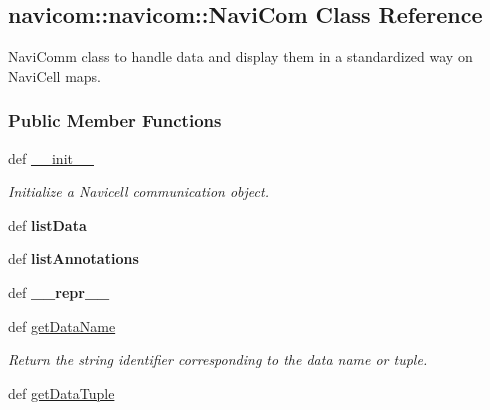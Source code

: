 \hypertarget{classnavicom_1_1navicom_1_1NaviCom}{
\subsection{navicom::navicom::NaviCom Class Reference}
\label{classnavicom_1_1navicom_1_1NaviCom}
}


NaviComm class to handle data and display them in a standardized way on NaviCell maps.  


\subsubsection*{Public Member Functions}
\begin{DoxyCompactItemize}
\item 
def \hyperlink{classnavicom_1_1navicom_1_1NaviCom_ae6133fe7ec63cf5643c1794f4f8e2349}{\_\-\_\-init\_\-\_\-}
\begin{DoxyCompactList}\small\item\em Initialize a Navicell communication object. \item\end{DoxyCompactList}\item 
\hypertarget{classnavicom_1_1navicom_1_1NaviCom_a6eadb16a25ab948c152661c740175383}{
def {\bfseries listData}}
\label{classnavicom_1_1navicom_1_1NaviCom_a6eadb16a25ab948c152661c740175383}

\item 
\hypertarget{classnavicom_1_1navicom_1_1NaviCom_aaf13b634968129b3216c5cb54b70c2ad}{
def {\bfseries listAnnotations}}
\label{classnavicom_1_1navicom_1_1NaviCom_aaf13b634968129b3216c5cb54b70c2ad}

\item 
\hypertarget{classnavicom_1_1navicom_1_1NaviCom_a29ada4f47f518f16ecd59dc569840078}{
def {\bfseries \_\-\_\-repr\_\-\_\-}}
\label{classnavicom_1_1navicom_1_1NaviCom_a29ada4f47f518f16ecd59dc569840078}

\item 
def \hyperlink{classnavicom_1_1navicom_1_1NaviCom_a51ecb41beebc7636bde73be2e1ffc407}{getDataName}
\begin{DoxyCompactList}\small\item\em Return the string identifier corresponding to the data name or tuple. \item\end{DoxyCompactList}\item 
\hypertarget{classnavicom_1_1navicom_1_1NaviCom_ad8ac5b74afb4ceb6ed094604787d4d19}{
def \hyperlink{classnavicom_1_1navicom_1_1NaviCom_ad8ac5b74afb4ceb6ed094604787d4d19}{getDataTuple}}
\label{classnavicom_1_1navicom_1_1NaviCom_ad8ac5b74afb4ceb6ed094604787d4d19}


\end{DoxyCompactItemize}
